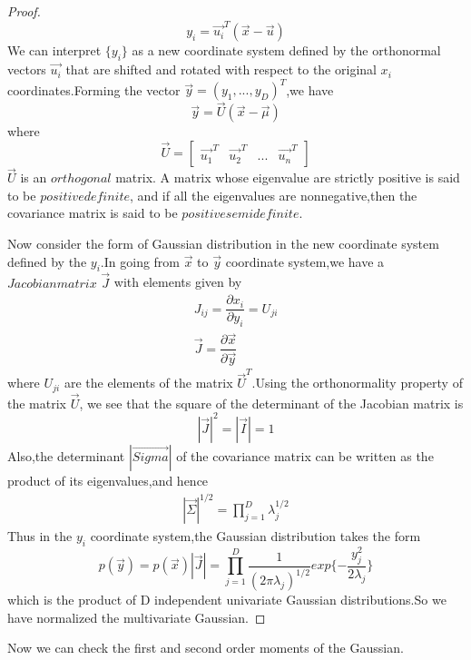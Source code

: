 \begin{proof}
  \begin{equation}
  	y_i = \vec{u_i}^T(\vec{x}-\vec{u})
  \end{equation}
  We can interpret $\{y_i\}$ as a new coordinate system defined by the orthonormal vectors $\vec{u_i}$ that are shifted and rotated with respect to the original $x_i$ coordinates.Forming the vector $\vec{y}=(y_1,...,y_D)^T$,we have
  \begin{equation}
  	\vec{y} = \vec{U}(\vec{x}-\vec{\mu})
  \end{equation}
  where
  \begin{equation}
  \vec{U} = \begin{bmatrix}
  \vec{u_1}^T & \vec{u_2}^T&...&\vec{u_n}^T
  \end{bmatrix}
  \end{equation}
  $\vec{U}$ is an $orthogonal$ matrix.
  A matrix whose eigenvalue are strictly positive is said to be $positive definite$, and if all the eigenvalues are nonnegative,then the covariance matrix is said to be $positive semidefinite$.
  
  Now consider  the form of Gaussian distribution in the new coordinate system defined by the $y_i$.In going from $\vec{x}$ to $\vec{y}$ coordinate system,we have a $Jacobian matrix$ $\vec{J}$ with elements given by
  \begin{eqnarray}
  	J_{ij} = \dfrac{\partial x_i}{\partial y_i} = U_{ji}\\
  	\vec{J} = \dfrac{\partial\vec{x}}{\partial\vec{y}}
  \end{eqnarray}
  where $U_{ji}$ are the elements of the matrix $\vec{U}^T$.Using the orthonormality property of the matrix $\vec{U}$, we see that the square of the determinant of the Jacobian matrix is
  \begin{equation}
  	|\vec{J}|^2 = |\vec{I}| = 1
  \end{equation}
  Also,the determinant $|\vec{Sigma}|$ of the covariance matrix can be written as the product of its eigenvalues,and hence
  \begin{eqnarray}
  |\vec{\Sigma}|^{1/2} = \prod_{j=1}^{D}\lambda_j^{1/2}
  \end{eqnarray}
  Thus in the $y_i$ coordinate system,the Gaussian distribution takes the form
  \begin{equation}
  p(\vec{y}) = p(\vec{x})|\vec{J}| = \prod_{j=1}^{D}\dfrac{1}{(2\pi \lambda_j)^{1/2}}exp\{-\dfrac{y_j ^2}{2\lambda_j}\}
  \end{equation}
  which is the product of D independent univariate Gaussian distributions.So we have normalized the multivariate Gaussian.
\end{proof}
Now we can check the first and second order moments of the Gaussian.

